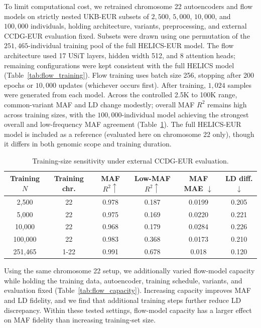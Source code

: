 \documentclass{article}
\begin{document}
To limit computational cost, we retrained chromosome 22 autoencoders and flow models on strictly nested UKB-EUR subsets of \(2{,}500\), \(5{,}000\), \(10{,}000\), and \(100{,}000\) individuals, holding architecture, variants, preprocessing, and external CCDG-EUR evaluation fixed. Subsets were drawn using one permutation of the \(251{,}465\)-individual training pool of the full HELICS-EUR model. The flow architecture used 17 USiT layers, hidden width 512, and 8 attention heads; remaining configurations were kept consistent with the full HELICS model (Table~\ref{tab:flow_training}). Flow training uses batch size 256, stopping after 200 epochs or \(10{,}000\) updates (whichever occurs first). After training, \(1{,}024\) samples were generated from each model. Across the controlled 2.5K to 100K range, common-variant MAF and LD change modestly; overall MAF \(R^2\) remains high across training sizes, with the \(100{,}000\)-individual model achieving the strongest overall and low-frequency MAF agreement (Table~\ref{tab:training_size}). The full HELICS-EUR model is included as a reference (evaluated here on chromosome 22 only), though it differs in both genomic scope and training duration. 

\begin{table}[h]
\centering
\caption{Training-size sensitivity under external CCDG-EUR evaluation.}
\label{tab:training_size}
\small
\begin{tabular}{cccccc}
\toprule
\textbf{Training \(N\)} & \textbf{Training chr.} & \textbf{MAF} \(R^2 \uparrow\) & \textbf{Low-MAF} \(R^2 \uparrow\) & \textbf{MAF MAE} \(\downarrow\) & \textbf{LD diff.} \(\downarrow\) \\
\midrule
2{,}500 & 22 & 0.978 & 0.187 & 0.0199 & 0.205 \\
5{,}000 & 22 & 0.975 & 0.169 & 0.0220 & 0.221 \\
10{,}000 & 22 & 0.968 & 0.179 & 0.0284 & 0.226 \\
100{,}000 & 22 & 0.983 & 0.368 & 0.0173 & 0.210 \\
\midrule
251{,}465 & 1-22 & 0.991 & 0.678 & 0.018 & 0.120 \\
\bottomrule
\end{tabular}
\end{table}

Using the same chromosome 22 setup, we additionally varied flow-model capacity while holding the training data, autoencoder, training schedule, variants, and evaluation fixed (Table~\ref{tab:flow_capacity}). Increasing capacity improves MAF and LD fidelity, and we find that additional training steps further reduce LD discrepancy. Within these tested settings, flow-model capacity has a larger effect on MAF fidelity than increasing training-set size.
\end{document}
